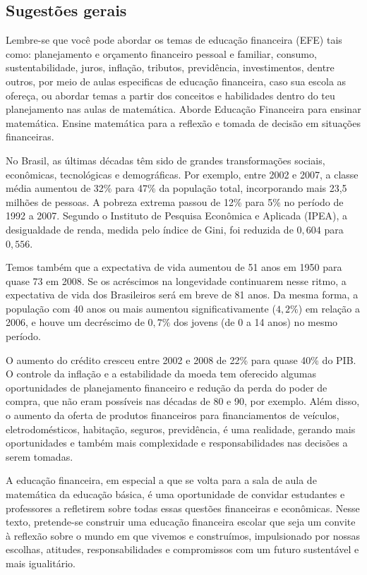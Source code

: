 \clearmargin
\begin{texto}
{
  \subsection{Sugestões gerais} Lembre-se que você pode abordar os temas de educação financeira (EFE) tais como: planejamento e orçamento financeiro pessoal e familiar, consumo, sustentabilidade, juros, inflação, tributos, previdência, investimentos, dentre outros, por meio de aulas especificas de educação financeira, caso sua escola as ofereça, ou abordar temas a partir dos conceitos e habilidades dentro do teu planejamento nas aulas de matemática. Aborde Educação Financeira para ensinar matemática. Ensine matemática para a reflexão e tomada de decisão em situações financeiras.
}
\end{texto}

\label{fin-exp-1}
No Brasil, as últimas décadas têm sido de grandes transformações sociais, econômicas, tecnológicas e demográficas. Por exemplo, entre 2002 e 2007, a classe média aumentou de 32\% para 47\% da população total, incorporando mais 23,5 milhões de pessoas. A pobreza extrema passou de 12\% para 5\% no período de 1992 a 2007. Segundo o Instituto de Pesquisa Econômica e Aplicada (IPEA), a desigualdade de renda, medida pelo índice de Gini, foi reduzida de $0{,}604$ para $0{,}556$.

Temos também que a expectativa de vida aumentou de 51 anos em 1950 para quase 73 em 2008. Se os acréscimos na longevidade continuarem nesse ritmo, a expectativa de vida dos Brasileiros será em breve de 81 anos. Da mesma forma, a população com 40 anos ou mais aumentou significativamente ($4,2\%$) em relação a 2006, e houve um decréscimo de $0,7\%$ dos jovens (de 0 a 14 anos) no mesmo período. 

O aumento do crédito cresceu entre 2002 e 2008 de 22\% para quase 40\% do PIB. O controle da inflação e a estabilidade da moeda tem oferecido algumas oportunidades de planejamento financeiro e redução da perda do poder de compra, que não eram possíveis nas décadas de 80 e 90, por exemplo. Além disso, o aumento da oferta de produtos financeiros para financiamentos de veículos, eletrodomésticos, habitação, seguros, previdência, é uma realidade, gerando mais oportunidades e também mais complexidade e responsabilidades nas decisões a serem tomadas.

A educação financeira, em especial a que se volta para a sala de aula de matemática da educação básica, é uma oportunidade de convidar estudantes e professores a refletirem sobre todas essas questões financeiras e econômicas. Nesse texto, pretende-se construir uma educação financeira escolar que seja um convite à reflexão sobre o mundo em que vivemos e construímos, impulsionado por nossas escolhas, atitudes, responsabilidades e compromissos com um futuro sustentável e mais igualitário.

